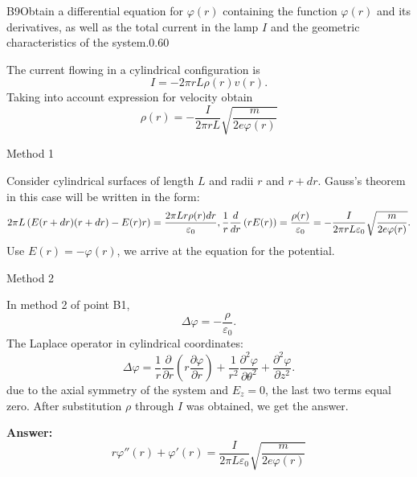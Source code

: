\documentclass[11pt,a4paper]{article}
\begin{document}
\begin{solcard}{B9}{Obtain a differential equation for $\varphi(r)$ containing the function $\varphi(r)$ and its derivatives, as well as the total current in the lamp $I$ and the geometric characteristics of the system.}{0.60}

The current flowing in a cylindrical configuration is $$I = -2\pi r L \rho(r) v(r).$$Taking into account expression for velocity obtain $$\rho(r) = -\frac{I}{2\pi r L} \sqrt{\frac{m}{2 e \varphi(r)}}$$


Method 1


Consider cylindrical surfaces of length $L$ and radii $r$ and $r + dr$. Gauss's theorem in this case will be written in the form: $$2\pi L \left(E(r+dr)(r+dr) - E(r)r\right) = \frac{2\pi L r \rho(r) dr}{\varepsilon_0}, \\ \frac{1}{r} \frac{d}{dr}\left(rE(r)\right) = \frac{\rho(r)}{\varepsilon_0} = -\frac{I}{2\pi r L \varepsilon_0} \sqrt{\frac{m}{2 e \varphi(r)}}.$$Use $E(r) = -\varphi(r)$, we arrive at the equation for the potential.


Method 2


In method 2 of point B1, $$\Delta \varphi = -\frac{\rho}{\varepsilon_0}.$$The Laplace operator in cylindrical coordinates: $$\Delta \varphi = \frac{1}{r} \frac{\partial}{\partial r} \left(r \frac{\partial \varphi}{\partial r}\right) + \frac{1}{r^2} \frac{\partial^2 \varphi}{\partial \theta^2} + \frac{\partial^2 \varphi}{\partial z^2}.$$due to the axial symmetry of the system and $E_z = 0$, the last two terms equal zero. After substitution $\rho$ through $I$ was obtained, we get the answer.

\par\smallskip\noindent\textbf{Answer:} $$r\varphi''(r)+\varphi'(r) = \frac{I}{2\pi L \varepsilon_0} \sqrt{\frac{m}{2 e \varphi(r)}}$$
\end{solcard}
\end{document}
